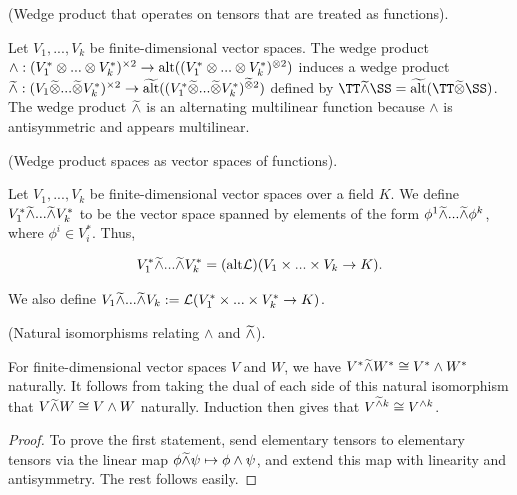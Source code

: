\begin{deriv}
    (Wedge product that operates on tensors that are treated as functions).
    
    Let $V_1, ..., V_k$ be finite-dimensional vector spaces. The wedge product ${\wedge:(V_1^* \otimes ... \otimes V_k^*)^{\times 2} \rightarrow \text{alt}((V_1^* \otimes ... \otimes V_k^*)^{\otimes 2})}$ induces a wedge product ${\widetilde{\wedge}: (V_1 \widetilde{\otimes} ... \widetilde{\otimes} V_k^*)^{\times 2} \rightarrow \widetilde{\text{alt}}((V_1^* \widetilde{\otimes} ... \widetilde{\otimes} V_k^*)^{\widetilde{\otimes} 2})}$ defined by $\TT \twedge \SS = \talt(\TT \totimes \SS)$. The wedge product $\widetilde{\wedge}$ is an alternating multilinear function because $\wedge$ is antisymmetric and appears multilinear.
\end{deriv}

\begin{defn}
    (Wedge product spaces as vector spaces of functions).
    
    Let $V_1, ..., V_k$ be finite-dimensional vector spaces over a field $K$. We define $V_1^* \widetilde{\wedge} ... \widetilde{\wedge} V_k^*$ to be the vector space spanned by elements of the form $\phi^1 \widetilde{\wedge} ... \widetilde{\wedge} \phi^k$, where $\phi^i \in V_i^*$. Thus,
    
    \begin{align*}
        V_1^* \widetilde{\wedge} ... \widetilde{\wedge} V_k^* = (\text{alt} \mathcal{L})(V_1 \times ... \times V_k \rightarrow K).
    \end{align*}
    
    We also define $V_1 \widetilde{\wedge} ... \widetilde{\wedge} V_k := \mathcal{L}(V_1^* \times ... \times V_k^* \rightarrow K)$.
\end{defn}

\begin{theorem}
    (Natural isomorphisms relating $\wedge$ and $\widetilde{\wedge}$).
     
    For finite-dimensional vector spaces $V$ and $W$, we have $V^* \widetilde{\wedge} W^* \cong V^* \wedge W^*$ naturally. It follows from taking the dual of each side of this natural isomorphism that $V \widetilde{\wedge} W \cong V \wedge W$ naturally. Induction then gives that $V^{\widetilde{\wedge} k} \cong V^{\wedge k}$.
\end{theorem}

\begin{proof}
    To prove the first statement, send elementary tensors to elementary tensors via the linear map $\phi \widetilde{\wedge} \psi \mapsto \phi \wedge \psi$, and extend this map with linearity and antisymmetry. The rest follows easily.
\end{proof}

